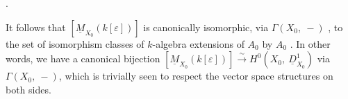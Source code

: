 \begin{center}
\quad .
\end{center}
It follows that  $[\underline{M}_{X_{0}}(k[\varepsilon])]$  is canonically isomorphic, via  $\Gamma(X_{0},\ -)$ , to the set of isomorphism classes of $k$-algebra extensions of  $A_{0}$  by  $A_{0}$ . In other words, we have a canonical bijection  $[\underline{M}_{X_{0}}(k[\varepsilon])] \overset{\sim}{\longrightarrow} H^{0}(X_{0},\ \underline{D}^{1}_{X_{0}})$  via $\Gamma(X_{0},\ -)$, which is trivially seen to respect the vector space structures on both sides.



